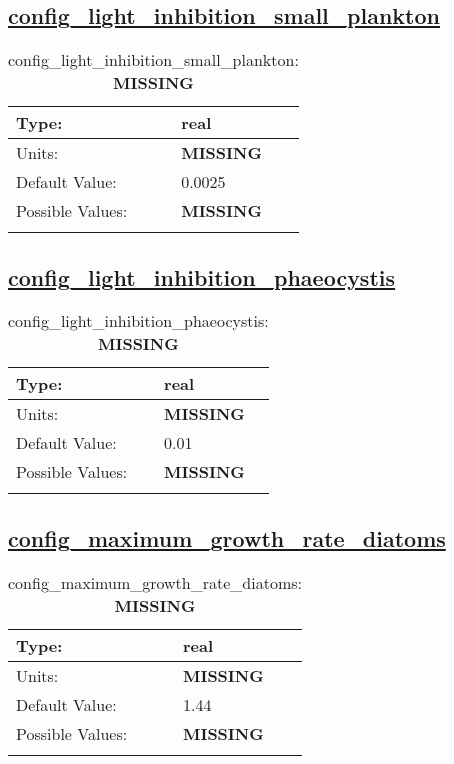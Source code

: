 \subsection[config\_light\_inhibition\_small\_plankton]{\hyperref[sec:nm_tab_biogeochemistry]{config\_light\_inhibition\_small\_plankton}}
\label{subsec:nm_sec_config_light_inhibition_small_plankton}
\begin{center}
\begin{longtable}{| p{2.0in} || p{4.0in} |}
    \hline
    Type: & real \\
    \hline
    Units: & {\bf \color{red} MISSING} \\
    \hline
    Default Value: & 0.0025 \\
    \hline
    Possible Values: & {\bf \color{red} MISSING} \\
    \hline
    \caption{config\_light\_inhibition\_small\_plankton: {\bf \color{red} MISSING}}
\end{longtable}
\end{center}
\subsection[config\_light\_inhibition\_phaeocystis]{\hyperref[sec:nm_tab_biogeochemistry]{config\_light\_inhibition\_phaeocystis}}
\label{subsec:nm_sec_config_light_inhibition_phaeocystis}
\begin{center}
\begin{longtable}{| p{2.0in} || p{4.0in} |}
    \hline
    Type: & real \\
    \hline
    Units: & {\bf \color{red} MISSING} \\
    \hline
    Default Value: & 0.01 \\
    \hline
    Possible Values: & {\bf \color{red} MISSING} \\
    \hline
    \caption{config\_light\_inhibition\_phaeocystis: {\bf \color{red} MISSING}}
\end{longtable}
\end{center}
\subsection[config\_maximum\_growth\_rate\_diatoms]{\hyperref[sec:nm_tab_biogeochemistry]{config\_maximum\_growth\_rate\_diatoms}}
\label{subsec:nm_sec_config_maximum_growth_rate_diatoms}
\begin{center}
\begin{longtable}{| p{2.0in} || p{4.0in} |}
    \hline
    Type: & real \\
    \hline
    Units: & {\bf \color{red} MISSING} \\
    \hline
    Default Value: & 1.44 \\
    \hline
    Possible Values: & {\bf \color{red} MISSING} \\
    \hline
    \caption{config\_maximum\_growth\_rate\_diatoms: {\bf \color{red} MISSING}}
\end{longtable}
\end{center}
